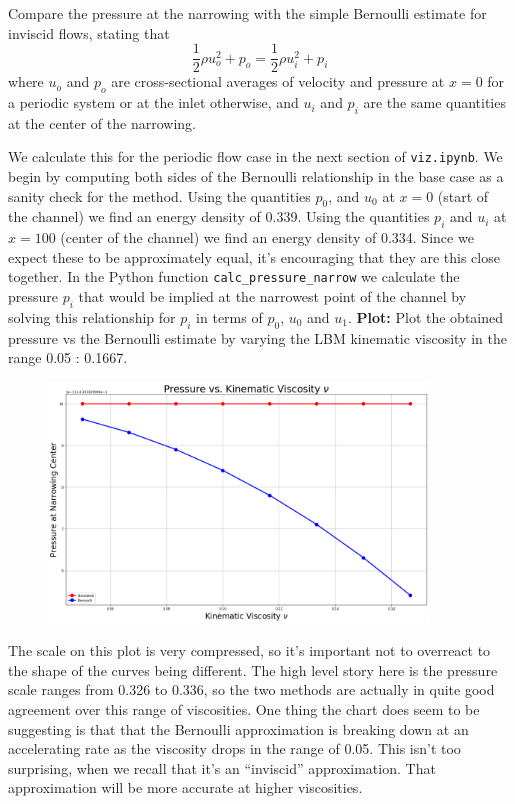 \documentclass[11pt]{article}
\newcommand{\tty}[1]{\texttt{#1}}
\begin{document}
    Compare the pressure at the narrowing with the simple Bernoulli estimate for inviscid flows, stating that
    $$
    \frac{1}{2} \rho u_o^2 + p_o = \frac{1}{2} \rho u_i^2 + p_i
    $$
    where $u_o$ and $p_o$ are cross-sectional averages of velocity and pressure at $x=0$ for a periodic system 
    or at the inlet otherwise, and $u_i$ and $p_i$ are the same quantities at the center of the narrowing. 

We calculate this for the periodic flow case in the next section of \tty{viz.ipynb}.
We begin by computing both sides of the Bernoulli relationship in the base case as a sanity check for the method.
Using the quantities $p_0$, and $u_0$ at $x=0$ (start of the channel) we find an energy density of 0.339.
Using the quantities $p_i$ and $u_i$ at $x=100$ (center of the channel) we find an energy density of 0.334.
Since we expect these to be approximately equal, it's encouraging that they are this close together.
In the Python function \tty{calc\_pressure\_narrow} we calculate the pressure $p_i$ that would be implied
at the narrowest point of the channel by solving this relationship for $p_i$ in terms of $p_0$, $u_0$ and $u_1$.
    \textbf{Plot:}
    Plot the obtained pressure vs the Bernoulli estimate by varying the LBM kinematic viscosity in the range 0.05 : 0.1667.
\begin{center}
\begin{figure}
\includegraphics[width=0.90\textwidth]{lbm_pbc_pressure_vs_nu.png}
\end{figure}
\end{center}  

The scale on this plot is very compressed, so it's important not to overreact to the shape of the curves being different.
The high level story here is the pressure scale ranges from 0.326 to 0.336, so the two methods are actually
in quite good agreement over this range of viscosities.
One thing the chart does seem to be suggesting is that that the Bernoulli approximation is breaking down at an
accelerating rate as the viscosity drops in the range of 0.05.
This isn't too surprising, when we recall that it's an ``inviscid'' approximation.
That approximation will be more accurate at higher viscosities.
\end{document}
